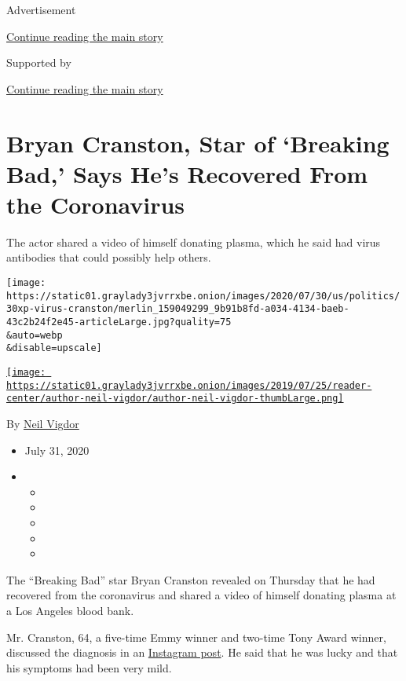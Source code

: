 Advertisement

\protect\hyperlink{after-top}{Continue reading the main story}

Supported by

\protect\hyperlink{after-sponsor}{Continue reading the main story}

\hypertarget{bryan-cranston-star-of-breaking-bad-says-hes-recovered-from-the-coronavirus}{%
\section{Bryan Cranston, Star of `Breaking Bad,' Says He's Recovered
From the
Coronavirus}\label{bryan-cranston-star-of-breaking-bad-says-hes-recovered-from-the-coronavirus}}

The actor shared a video of himself donating plasma, which he said had
virus antibodies that could possibly help others.

\texttt{[image: https://static01.graylady3jvrrxbe.onion/images/2020/07/30/us/politics/30xp-virus-cranston/merlin\_159049299\_9b91b8fd-a034-4134-baeb-43c2b24f2e45-articleLarge.jpg?quality=75\\\&auto=webp\\\&disable=upscale]}

\href{https://www.nytimes3xbfgragh.onion/by/neil-vigdor}{\texttt{[image: https://static01.graylady3jvrrxbe.onion/images/2019/07/25/reader-center/author-neil-vigdor/author-neil-vigdor-thumbLarge.png]}}

By \href{https://www.nytimes3xbfgragh.onion/by/neil-vigdor}{Neil Vigdor}

\begin{itemize}
\item
  July 31, 2020
\item
  \begin{itemize}
  \item
  \item
  \item
  \item
  \item
  \end{itemize}
\end{itemize}

The ``Breaking Bad'' star Bryan Cranston revealed on Thursday that he
had recovered from the coronavirus and shared a video of himself
donating plasma at a Los Angeles blood bank.

Mr. Cranston, 64, a five-time Emmy winner and two-time Tony Award
winner, discussed the diagnosis in an
\href{https://www.instagram.com/tv/CDReUi1pcDm/?utm_source=ig_web_copy_link}{Instagram
post}. He said that he was lucky and that his symptoms had been very
mild.

